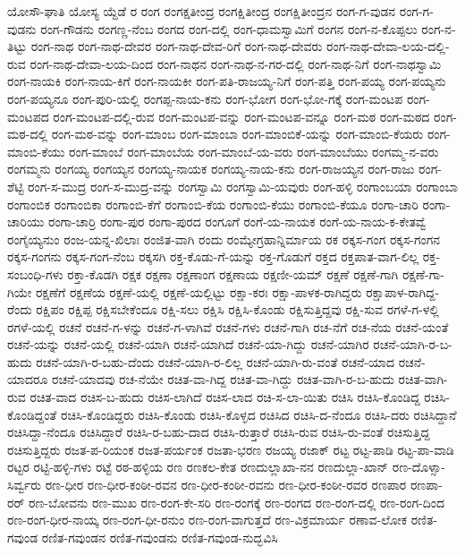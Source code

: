 ಯೋಸೌ-ಘಾತಿ
ಯೋಸ್ಯ
ಯ್ದೆಡೆ
ರ
ರಂಗ
ರಂಗಕ್ಷತೀಂದ್ರ
ರಂಗಕ್ಷಿತೀಂದ್ರ
ರಂಗಕ್ಷಿತೀಂದ್ರನ
ರಂಗ-ಗ-ವುಡನ
ರಂಗ-ಗ-ವುಡನು
ರಂಗ-ಗೌಡನು
ರಂಗಣ್ಣ-ನೆಂಬ
ರಂಗದ
ರಂಗ-ದಲ್ಲಿ
ರಂಗ-ಧಾಮಸ್ವಾಮಿಗೆ
ರಂಗನ
ರಂಗ-ನ-ಕೊಪ್ಪಲು
ರಂಗ-ನ-ತಿಟ್ಟು
ರಂಗ-ನಾಥ
ರಂಗ-ನಾಥ-ದೇವರ
ರಂಗ-ನಾಥ-ದೇವ-ರಿಗೆ
ರಂಗ-ನಾಥ-ದೇವರು
ರಂಗ-ನಾಥ-ದೇವಾ-ಲಯ-ದಲ್ಲಿ-ರುವ
ರಂಗ-ನಾಥ-ದೇವಾ-ಲಯ-ದಿಂದ
ರಂಗ-ನಾಥನ
ರಂಗ-ನಾಥ-ನ-ಗರ-ದಲ್ಲಿ
ರಂಗ-ನಾಥ-ನಿಗೆ
ರಂಗ-ನಾಥಸ್ವಾಮಿ
ರಂಗ-ನಾಯಕಿ
ರಂಗ-ನಾಯ-ಕಿಗೆ
ರಂಗ-ನಾಯಕೀ
ರಂಗ-ಪತಿ-ರಾಜಯ್ಯ-ನಿಗೆ
ರಂಗ-ಪತ್ತಿ
ರಂಗ-ಪಯ್ಯ
ರಂಗ-ಪಯ್ಯನು
ರಂಗ-ಪಯ್ಯನೂ
ರಂಗ-ಪುರಿ-ಯಲ್ಲಿ
ರಂಗಪ್ಪ-ನಾಯ-ಕನು
ರಂಗ-ಭೋಗ
ರಂಗ-ಭೋ-ಗಕ್ಕೆ
ರಂಗ-ಮಂಟಪ
ರಂಗ-ಮಂಟಪದ
ರಂಗ-ಮಂಟಪ-ದಲ್ಲಿ-ರುವ
ರಂಗ-ಮಂಟಪ-ವನ್ನು
ರಂಗ-ಮಂಟಪ-ವನ್ನೂ
ರಂಗ-ಮಠ
ರಂಗ-ಮಠದ
ರಂಗ-ಮಠ-ದಲ್ಲಿ
ರಂಗ-ಮಠ-ವನ್ನು
ರಂಗ-ಮಾಂಬ
ರಂಗ-ಮಾಂಬಾ
ರಂಗ-ಮಾಂಬಿಕೆ-ಯನ್ನು
ರಂಗ-ಮಾಂಬಿ-ಕೆಯರು
ರಂಗ-ಮಾಂಬಿ-ಕೆಯು
ರಂಗ-ಮಾಂಬೆ
ರಂಗ-ಮಾಂಬೆಯ
ರಂಗ-ಮಾಂಬೆ-ಯ-ವರು
ರಂಗ-ಮಾಂಬೆಯು
ರಂಗಮ್ಮ-ನ-ವರು
ರಂಗಮ್ಮನು
ರಂಗಯ್ಯ
ರಂಗಯ್ಯನ
ರಂಗಯ್ಯ-ನಾಯಕ
ರಂಗಯ್ಯ-ನಾಯ-ಕನು
ರಂಗ-ರಾಜಯ್ಯನ
ರಂಗ-ರಾಜು
ರಂಗ-ಶೆಟ್ಟಿ
ರಂಗ-ಸ-ಮುದ್ರ
ರಂಗ-ಸ-ಮುದ್ರ-ವನ್ನು
ರಂಗಸ್ವಾಮಿ
ರಂಗಸ್ವಾಮಿ-ಯವುರು
ರಂಗ-ಹಳ್ಳಿ
ರಂಗಾಂಬಯಾ
ರಂಗಾಂಬಾ
ರಂಗಾಂಬಿಕ
ರಂಗಾಂಬಿಕಾ
ರಂಗಾಂಬಿ-ಕೆಗೆ
ರಂಗಾಂಬಿ-ಕೆಯ
ರಂಗಾಂಬಿ-ಕೆಯು
ರಂಗಾಂಬಿ-ಕೆಯೂ
ರಂಗಾ-ಚಾರಿ
ರಂಗಾ-ಚಾರಿಯು
ರಂಗಾ-ಚಾರ್ರಿ
ರಂಗಾ-ಪುರ
ರಂಗಾ-ಪುರದ
ರಂಗೂಗೆ
ರಂಗೆ-ಯ-ನಾಯಕ
ರಂಗೆ-ಯ-ನಾಯ-ಕ-ಕೇತವ್ವೆ
ರಂಗೈಯ್ಯನುಂ
ರಂಜ-ಯನ್ನ-ಖಿಲಾಃ
ರಂಜಿತ-ವಾಗಿ
ರಂದು
ರಂಮ್ಯೇಗ್ರಹಾನ್ನಿರ್ಮಾಯ
ರಕ
ರಕ್ಕಸ-ಗಂಗ
ರಕ್ಕಸ-ಗಂಗನ
ರಕ್ಕಸ-ಗಂಗನು
ರಕ್ಕಸ-ಗಂಗ-ನೆಂಬ
ರಕ್ಕಸಗಿ
ರಕ್ತ-ಕೊಡು-ಗೆ-ಯನ್ನು
ರಕ್ತ-ಗೊಡುಗೆ
ರಕ್ತದ
ರಕ್ತಪಾತ-ವಾಗ-ಲಿಲ್ಲ
ರಕ್ತ-ಸಂಬಂಧಿ-ಗಳು
ರಕ್ತಾ-ಕೊಡಗಿ
ರಕ್ಷಕ
ರಕ್ಷಣಾ
ರಕ್ಷಣಾಂಗ
ರಕ್ಷಣಾಯ
ರಕ್ಷಣೀ-ಯಮ್
ರಕ್ಷಣೆ
ರಕ್ಷಣೆ-ಗಾಗಿ
ರಕ್ಷಣೆ-ಗಾ-ಗಿಯೇ
ರಕ್ಷಣೆಗೆ
ರಕ್ಷಣೆಯ
ರಕ್ಷಣೆ-ಯಲ್ಲಿ
ರಕ್ಷಣೆ-ಯಲ್ಲಿಟ್ಟು
ರಕ್ಷಾ-ಕರಃ
ರಕ್ಷಾ-ಪಾಳಕ-ರಾಗಿದ್ದರು
ರಕ್ಷಾಪಾಳ-ರಾಗಿದ್ದ-ರೆಂದು
ರಕ್ಷಿಪಂ
ರಕ್ಷಿಪ್ಪ
ರಕ್ಷಿಸಬೇಕೆಂದೂ
ರಕ್ಷಿ-ಸಲು
ರಕ್ಷಿಸಿ
ರಕ್ಷಿಸಿ-ಕೊಂಡು
ರಕ್ಷಿಸುತ್ತಿದ್ದವು
ರಕ್ಷಿ-ಸುವ
ರಗಳೆ-ಗ-ಳಲ್ಲಿ
ರಗಳೆ-ಯಲ್ಲಿ
ರಚನೆ
ರಚನೆ-ಗ-ಳನ್ನು
ರಚನೆ-ಗ-ಳಾಗಿವೆ
ರಚನೆ-ಗಳು
ರಚನೆ-ಗಾಗಿ
ರಚ-ನೆಗೆ
ರಚ-ನೆಯ
ರಚನೆ-ಯಂತೆ
ರಚನೆ-ಯನ್ನು
ರಚನೆ-ಯಲ್ಲಿ
ರಚನೆ-ಯಾಗಿ
ರಚನೆ-ಯಾಗಿದೆ
ರಚನೆ-ಯಾ-ಗಿದ್ದು
ರಚನೆ-ಯಾಗಿರ
ರಚನೆ-ಯಾಗಿ-ರ-ಬ-ಹುದು
ರಚನೆ-ಯಾಗಿ-ರ-ಬಹು-ದೆಂದು
ರಚನೆ-ಯಾಗಿ-ರ-ಲಿಲ್ಲ
ರಚನೆ-ಯಾಗಿ-ರು-ವಂತೆ
ರಚನೆ-ಯಾದ
ರಚನೆ-ಯಾದರೂ
ರಚನೆ-ಯಾದವು
ರಚ-ನೆಯೇ
ರಚಿತ-ವಾ-ಗಿದ್ದ
ರಚಿತ-ವಾ-ಗಿದ್ದು
ರಚಿತ-ವಾಗಿ-ರ-ಬ-ಹುದು
ರಚಿತ-ವಾಗಿ-ರುವ
ರಚಿತ-ವಾದ
ರಚಿಸ-ಬ-ಹುದು
ರಚಿಸ-ಲಾಗಿದೆ
ರಚಿಸ-ಲಾದ
ರಚಿ-ಸ-ಲಾ-ಯಿತು
ರಚಿಸಿ
ರಚಿಸಿ-ಕೊಂಡಿದ್ದ
ರಚಿಸಿ-ಕೊಂಡಿದ್ದಂತೆ
ರಚಿಸಿ-ಕೊಂಡಿದ್ದರು
ರಚಿಸಿ-ಕೊಂಡು
ರಚಿಸಿ-ಕೊಳ್ಳದ
ರಚಿಸಿದ
ರಚಿಸಿ-ದ-ನೆಂದೂ
ರಚಿಸಿ-ದರು
ರಚಿಸಿದ್ದಾನೆ
ರಚಿಸಿದ್ದಾ-ನೆಂದೂ
ರಚಿಸಿದ್ದಾರೆ
ರಚಿಸಿ-ರ-ಬಹು-ದಾದ
ರಚಿಸಿ-ರುತ್ತಾರೆ
ರಚಿಸಿ-ರುವ
ರಚಿಸಿ-ರು-ವಂತೆ
ರಚಿಸುತ್ತಿದ್ದ
ರಚಿಸುತ್ತಿದ್ದರು
ರಜತ-ಪ-ರಿಯಂಕ
ರಜತ-ಪರ್ಯಂಕ
ರಜತಾ-ಭರಣ
ರಜಯ್ಯ
ರಜಾಕ್
ರಟ್ಟ
ರಟ್ಟ-ಪಾಡಿ
ರಟ್ಟ-ಪಾ-ವಾಡಿ
ರಟ್ಟರ
ರಟ್ಟಿ-ಹಳ್ಳಿ-ಗಳು
ರಟ್ಟೆ
ರಠ-ಹಳ್ಳಿಯ
ರಣ
ರಣಕಲ-ಕೇತ
ರಣದುಲ್ಲಾಖಾ-ನನ
ರಣದುಲ್ಲಾ-ಖಾನ್
ರಣ-ದೊಳ್ಸಾ-ಸಿರ್ವ್ವರು
ರಣ-ಧೀರ
ರಣ-ಧೀರ-ಕಂಠೀ-ರವನ
ರಣ-ಧೀರ-ಕಂಠೀ-ರವನು
ರಣ-ಧೀರ-ಕಂಠೀ-ರವರ
ರಣಪಾರ
ರಣಪಾ-ರರ್
ರಣ-ಬೋವನು
ರಣ-ಮುಖ
ರಣ-ರಂಗ-ಕೇ-ಸರಿ
ರಣ-ರಂಗಕ್ಕೆ
ರಣ-ರಂಗದ
ರಣ-ರಂಗ-ದಲ್ಲಿ
ರಣ-ರಂಗ-ದಿಂದ
ರಣ-ರಂಗ-ಧೀರ-ನಾಯ್ಕ
ರಣ-ರಂಗ-ಧೀ-ರನುಂ
ರಣ-ರಂಗ-ವಾಗುತ್ತದೆ
ರಣ-ವಿಕ್ರಮಾರ್ಯ
ರಣಾವ-ಲೋಕ
ರಣಿತ-ಗವುಂಡ
ರಣಿತ-ಗವುಂಡನ
ರಣಿತ-ಗವುಂಡನು
ರಣಿತ-ಗವುಂಡ-ನುದ್ಭವಿಸಿ
